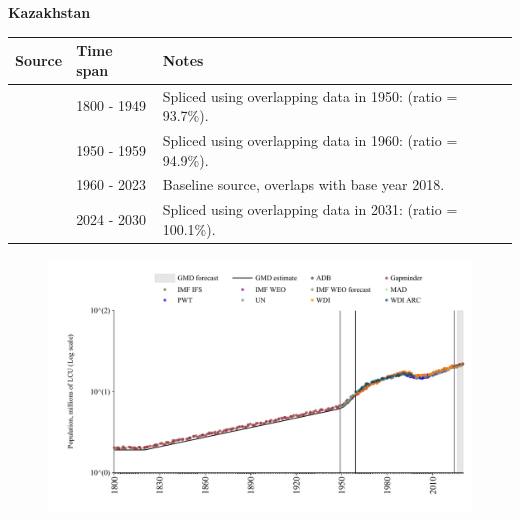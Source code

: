 \documentclass[12pt,a4paper,landscape]{article}
\begin{document}
\begin{adjustbox}{max totalsize={\paperwidth}{\paperheight},center}
\begin{minipage}[t][\textheight][t]{\textwidth}
\vspace*{0.5cm}
{}
\begin{center}
{\Large\bfseries Kazakhstan}
\end{center}
\vspace{0.5cm}
\begin{table}[H]
\centering
\small
\begin{tabular}{|l|l|l|}
\hline
\textbf{Source} & \textbf{Time span} & \textbf{Notes} \\
\hline
\rowcolor{white}\cite{Gapminder}& 1800 - 1949 &Spliced using overlapping data in 1950: (ratio = 93.7\%).\\
\rowcolor{lightgray}\cite{IMF_IFS}& 1950 - 1959 &Spliced using overlapping data in 1960: (ratio = 94.9\%).\\
\rowcolor{white}\cite{WDI}& 1960 - 2023 &Baseline source, overlaps with base year 2018.\\
\rowcolor{lightgray}\cite{Gapminder}& 2024 - 2030 &Spliced using overlapping data in 2031: (ratio = 100.1\%).\\
\hline
\end{tabular}
\end{table}
\begin{figure}[H]
\centering
\includegraphics[width=\textwidth,height=0.6\textheight,keepaspectratio]{graphs/KAZ_pop.pdf}
\end{figure}
\end{minipage}
\end{adjustbox}
\end{document}
